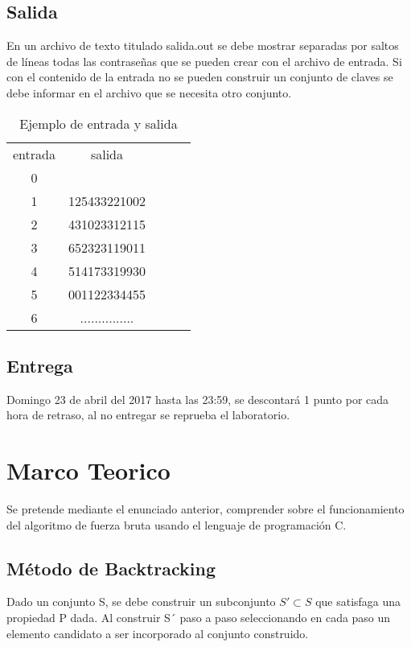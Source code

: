 \documentclass[9pt,twocolumn,twoside]{optica}
\begin{document}
\subsection{Salida}
En un archivo de texto titulado
salida.out
se debe mostrar separadas por
saltos de líneas todas las contraseñas que se pueden crear con el archivo de
entrada. Si con el contenido de la entrada no se pueden construir un conjunto
de claves se debe informar en el archivo que se necesita otro conjunto.



\begin{table}
\centering
\caption{Ejemplo de entrada y salida }
\label{my-label}
\begin{tabular}{|c|c|lll}
\cline{1-2}
entrada & salida &  &  &  \\ \cline{1-2}
0         &          &  &  &  \\ \cline{1-2}
1         & 125433221002         &  &  &  \\ \cline{1-2}
2         & 431023312115         &  &  &  \\ \cline{1-2}
3         & 652323119011         &  &  &  \\ \cline{1-2}
4         & 514173319930         &  &  &  \\ \cline{1-2}
5         & 001122334455         &  &  &  \\ \cline{1-2}
6         & ...............         &  &  &  \\ \cline{1-2}
\end{tabular}
\end{table}

\subsection{Entrega}
Domingo 23 de abril del 2017 hasta las 23:59, se descontará 1 punto
por cada hora de retraso, al no entregar se reprueba el laboratorio.


\section{Marco Teorico}
Se pretende mediante el enunciado anterior, comprender sobre el funcionamiento del algoritmo de fuerza bruta usando el lenguaje de programación C.

\subsection{Método de Backtracking}
Dado un conjunto S, se debe construir un subconjunto $ S' \subset S $
 que satisfaga una propiedad P dada.
Al construir S´ paso a paso seleccionando en cada paso un elemento candidato a ser incorporado al conjunto construido.
\end{document}
